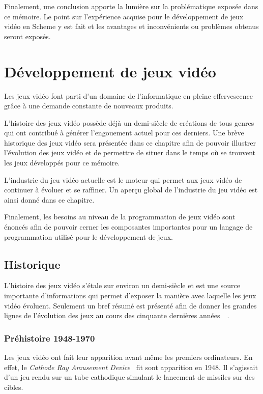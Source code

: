 \documentclass[12pt,oneside,letterpaper,francais]{book}
\begin{document}
Finalement, une conclusion apporte la lumière sur la problématique
exposée dans ce mémoire. Le point sur l'expérience acquise pour le
développement de jeux vidéo en Scheme y est fait et les avantages et
inconvénients ou problèmes obtenus seront exposés.




\chapter{Développement de jeux vidéo}
\label{Chap:JV}

Les jeux vidéo font parti d'un domaine de l'informatique en pleine
effervescence grâce à une demande constante de nouveaux
produits. 

L'histoire des jeux vidéo possède déjà un demi-siècle de créations de
tous genres qui ont contribué à générer l'engouement actuel pour ces
derniers. Une brève historique des jeux vidéo sera présentée dans ce
chapitre afin de pouvoir illustrer l'évolution des jeux vidéo et de
permettre de situer dans le temps où se trouvent les jeux développés
pour ce mémoire.

L'industrie du jeu vidéo actuelle est le moteur qui permet aux jeux
vidéo de continuer à évoluer et se raffiner. Un aperçu global de
l'industrie du jeu vidéo est ainsi donné dans ce chapitre.

Finalement, les besoins au niveau de la programmation de jeux vidéo
sont énoncés afin de pouvoir cerner les composantes importantes pour
un langage de programmation utilisé pour le développement de jeux.


\section{Historique}

L'histoire des jeux vidéo s'étale sur environ un demi-siècle et est
une source importante d'informations qui permet d'exposer la manière
avec laquelle les jeux vidéo évoluent. Seulement un bref résumé est
présenté afin de donner les grandes lignes de l'évolution des
jeux au cours des cinquante dernières
années~\cite{VIDEOGAMES_history}~\cite{HISCORE}.


\subsection{Préhistoire 1948-1970}
Les jeux vidéo ont fait leur apparition avant même les premiers
ordinateurs. En effet, le \textit{Cathode Ray Amusement
  Device}~\cite{CRTAD} fit sont apparition en 1948. Il s'agissait d'un
jeu rendu sur un tube cathodique simulant le lancement de missiles sur
des cibles.
\end{document}
